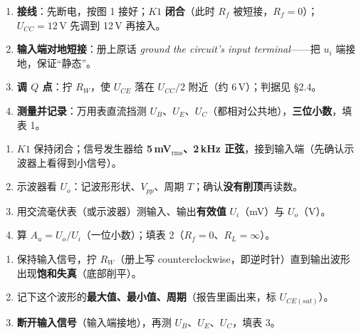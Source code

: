 \documentclass[11pt]{ctexart}
\let\orighdr\hdr
\renewcommand{\hdr}[2]{\needspace{9\baselineskip}\orighdr{#1}{#2}}
\let\origsubhdr\subhdr
\renewcommand{\subhdr}[1]{\needspace{3\baselineskip}\origsubhdr{#1}}
\begin{document}


\begin{enumerate}
  \item \textbf{接线}：先断电，按图 1 接好；$K1$ \textbf{闭合}（此时 $R_f$ 被短接，$R_f=0$）；$U_{CC}=12\,\mathrm{V}$ 先调到 12\,V 再接入。
  \item \textbf{输入端对地短接}：册上原话 \textit{ground the circuit's input terminal}——把 $u_i$ 端接地，保证“静态”。
  \item \textbf{调 $Q$ 点}：拧 $R_W$，使 $U_{CE}$ 落在 $U_{CC}/2$ 附近（约 6\,V）；判据见 §2.4。
  \item \textbf{测量并记录}：万用表直流挡测 $U_B$、$U_E$、$U_C$（都相对公共地），\textbf{三位小数}，填表 1。
\end{enumerate}


\begin{enumerate}
  \item $K1$ 保持闭合；信号发生器给 \textbf{5\,mV$_{\mathrm{rms}}$、2\,kHz 正弦}，接到输入端（先确认示波器上看得到小信号）。
  \item 示波器看 $U_o$：记波形形状、$V_{pp}$、周期 $T$；确认\textbf{没有削顶}再读数。
  \item 用交流毫伏表（或示波器）测输入、输出\textbf{有效值} $U_i$（mV）与 $U_o$（V）。
  \item 算 $A_u=U_o/U_i$（一位小数）；填表 2（$R_f=0$、$R_L=\infty$）。
\end{enumerate}



\begin{enumerate}
  \item 保持输入信号，拧 $R_W$（册上写 counterclockwise，即逆时针）直到输出波形出现\textbf{饱和失真}（底部削平）。
  \item 记下这个波形的\textbf{最大值、最小值、周期}（报告里画出来，标 $U_{CE(sat)}$）。
  \item \textbf{断开输入信号}（输入端接地），再测 $U_B$、$U_E$、$U_C$，填表 3。
\end{enumerate}
\end{document}
